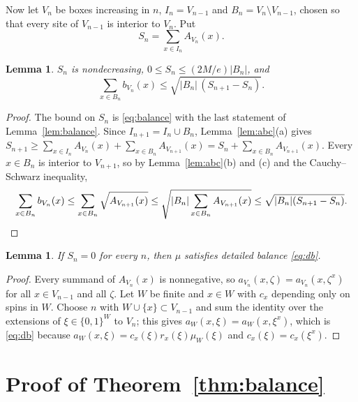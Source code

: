 \documentclass[11pt]{amsart}
\newtheorem{lemma}[theorem]{Lemma}
\theoremstyle{remark}
\begin{document}
Now let $V_n$ be boxes increasing in $n$, $I_n=V_{n-1}$ and $B_n=V_n\setminus V_{n-1}$, chosen so that every site of
$V_{n-1}$ is interior to $V_n$. Put
\[
S_n=\sum_{x\in I_n}A_{V_n}(x).
\]

\begin{lemma}\label{lem:shell}
$S_n$ is nondecreasing, $0\le S_n\le(2M/e)|B_n|$, and
\begin{equation}\label{eq:current}
\sum_{x\in B_n}b_{V_n}(x)\le\sqrt{|B_n|\,(S_{n+1}-S_n)} .
\end{equation}
\end{lemma}

\begin{proof}
The bound on $S_n$ is \eqref{eq:balance} with the last statement of Lemma~\ref{lem:balance}. Since
$I_{n+1}=I_n\cup B_n$, Lemma~\ref{lem:abc}(a) gives
$S_{n+1}\ge\sum_{x\in I_n}A_{V_n}(x)+\sum_{x\in B_n}A_{V_{n+1}}(x)=S_n+\sum_{x\in B_n}A_{V_{n+1}}(x)$. Every $x\in B_n$
is interior to $V_{n+1}$, so by Lemma~\ref{lem:abc}(b) and (c) and the Cauchy--Schwarz inequality,
\[
\sum_{x\in B_n}b_{V_n}(x)\le\sum_{x\in B_n}\sqrt{A_{V_{n+1}}(x)}\le\sqrt{|B_n|\sum_{x\in B_n}A_{V_{n+1}}(x)}
\le\sqrt{|B_n|(S_{n+1}-S_n)} .\qedhere
\]
\end{proof}

\begin{lemma}\label{lem:zeroS}
If $S_n=0$ for every $n$, then $\mu$ satisfies detailed balance \eqref{eq:db}.
\end{lemma}

\begin{proof}
Every summand of $A_{V_n}(x)$ is nonnegative, so $a_{V_n}(x,\zeta)=a_{V_n}(x,\zeta^x)$ for all $x\in V_{n-1}$ and all
$\zeta$. Let $W$ be finite and $x\in W$ with $c_x$ depending only on spins in $W$. Choose $n$ with $W\cup\{x\}\subset
V_{n-1}$ and sum the identity over the extensions of $\xi\in\{0,1\}^W$ to $V_n$; this gives
$a_W(x,\xi)=a_W(x,\xi^x)$, which is \eqref{eq:db} because $a_W(x,\xi)=c_x(\xi)r_x(\xi)\mu_W(\xi)$ and
$c_x(\xi)=c_x(\xi^x)$.
\end{proof}

\section{Proof of Theorem~\ref{thm:balance}}\label{sec:proofs}
\end{document}
